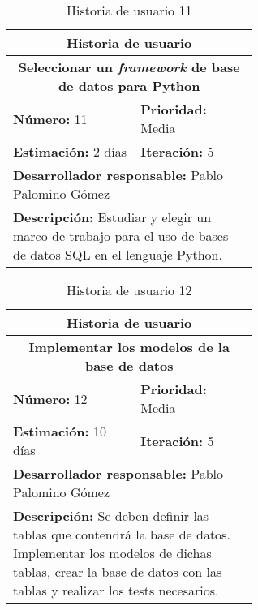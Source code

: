 \begin{table}[H]
        \centering
        \begin{tabular}{|p{0.3\linewidth}|p{0.3\linewidth}|}
          \hline
          \multicolumn{2}{|c|}{Historia de usuario}\\ \hline
          \multicolumn{2}{|c|}{\textbf{Seleccionar un \textit{framework} de base de datos para Python}}\\ \hline
          \textbf{Número:} 11 & \textbf{Prioridad:} Media\\ \hline
          \textbf{Estimación:} 2 días & \textbf{Iteración:} 5\\ \hline
          \multicolumn{2}{|l|}{\textbf{Desarrollador responsable:} Pablo Palomino Gómez}\\ \hline
          \multicolumn{2}{|p{0.6\linewidth}|}{\textbf{Descripción:} Estudiar y elegir un marco de trabajo para el uso de bases de datos SQL en el lenguaje Python.}\\ \hline
        \end{tabular}
        \caption{Historia de usuario 11}
        \label{tab:hist11}
\end{table}
\begin{table}[H]
        \centering
        \begin{tabular}{|p{0.3\linewidth}|p{0.3\linewidth}|}
          \hline
          \multicolumn{2}{|c|}{Historia de usuario}\\ \hline
          \multicolumn{2}{|c|}{\textbf{Implementar los modelos de la base de datos}}\\ \hline
          \textbf{Número:} 12 & \textbf{Prioridad:} Media\\ \hline
          \textbf{Estimación:} 10 días & \textbf{Iteración:} 5\\ \hline
          \multicolumn{2}{|l|}{\textbf{Desarrollador responsable:} Pablo Palomino Gómez}\\ \hline
          \multicolumn{2}{|p{0.6\linewidth}|}{\textbf{Descripción:} Se deben definir las tablas que contendrá la base de datos. Implementar los modelos de dichas tablas, crear la base de datos con las tablas y realizar los tests necesarios.}\\ \hline
        \end{tabular}
        \caption{Historia de usuario 12}
        \label{tab:hist12}
\end{table}
